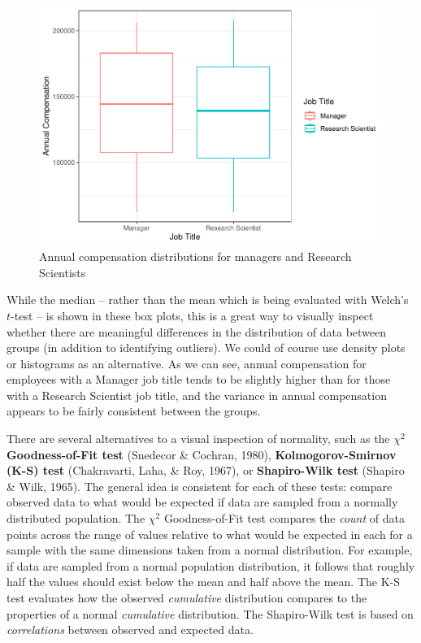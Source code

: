 \documentclass[
]{book}
\begin{document}
\begin{figure}

{\centering \includegraphics[width=1\linewidth]{The_Fundamentals_of_People_Analytics_files/figure-latex/comp-job-boxplots-1} 

}

\caption{Annual compensation distributions for managers and Research Scientists}\label{fig:comp-job-boxplots}
\end{figure}

While the median -- rather than the mean which is being evaluated with Welch's \(t\)-test -- is shown in these box plots, this is a great way to visually inspect whether there are meaningful differences in the distribution of data between groups (in addition to identifying outliers). We could of course use density plots or histograms as an alternative. As we can see, annual compensation for employees with a Manager job title tends to be slightly higher than for those with a Research Scientist job title, and the variance in annual compensation appears to be fairly consistent between the groups.

There are several alternatives to a visual inspection of normality, such as the \({\chi}^2\) \textbf{Goodness-of-Fit test} (Snedecor \& Cochran, 1980), \textbf{Kolmogorov-Smirnov (K-S) test} (Chakravarti, Laha, \& Roy, 1967), or \textbf{Shapiro-Wilk test} (Shapiro \& Wilk, 1965). The general idea is consistent for each of these tests: compare observed data to what would be expected if data are sampled from a normally distributed population. The \({\chi}^2\) Goodness-of-Fit test compares the \emph{count} of data points across the range of values relative to what would be expected in each for a sample with the same dimensions taken from a normal distribution. For example, if data are sampled from a normal population distribution, it follows that roughly half the values should exist below the mean and half above the mean. The K-S test evaluates how the observed \emph{cumulative} distribution compares to the properties of a normal \emph{cumulative} distribution. The Shapiro-Wilk test is based on \emph{correlations} between observed and expected data.
\end{document}
